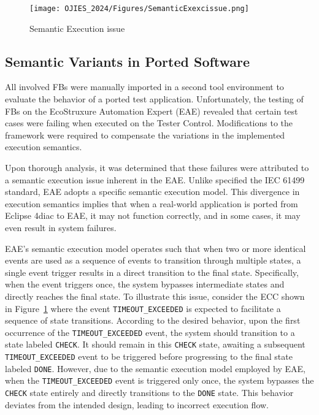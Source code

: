 \begin{figure}[h!]
	\centering
		\texttt{[image: OJIES\_2024/Figures/SemanticExexcissue.png]}
		\caption{Semantic Execution issue}
		\label{fig:SemanticExexcissue}	
 \end{figure}

\subsection{Semantic Variants in Ported Software}
All involved FBs were manually imported in a second tool environment to evaluate the behavior of a ported test application. Unfortunately, the testing of FBs on the EcoStruxure Automation Expert (EAE) revealed that certain test cases were failing when executed on the Tester Control. Modifications to the framework were required to compensate the variations in the implemented execution semantics.

Upon thorough analysis, it was determined that these failures were attributed to a semantic execution issue inherent in the EAE. Unlike specified the IEC 61499 standard, EAE adopts a specific semantic execution model. This divergence in execution semantics implies that when a real-world application is ported from Eclipse 4diac to EAE, it may not function correctly, and in some cases, it may even result in system failures.

EAE's semantic execution model operates such that when two or more identical events are used as a sequence of events to transition through multiple states, a single event trigger results in a direct transition to the final state. Specifically, when the event triggers once, the system bypasses intermediate states and directly reaches the final state. 
To illustrate this issue, consider the ECC shown in Figure~\ref{fig:SemanticExexcissue} where the event \texttt{TIMEOUT\_EXCEEDED} is expected to facilitate a sequence of state transitions. According to the desired behavior, upon the first occurrence of the \texttt{TIMEOUT\_EXCEEDED} event, the system should transition to a state labeled \texttt{CHECK}. It should remain in this \texttt{CHECK} state, awaiting a subsequent \texttt{TIMEOUT\_EXCEEDED} event to be triggered before progressing to the final state labeled \texttt{DONE}. However, due to the semantic execution model employed by EAE, when the \texttt{TIMEOUT\_EXCEEDED} event is triggered only once, the system bypasses the \texttt{CHECK} state entirely and directly transitions to the \texttt{DONE} state. This behavior deviates from the intended design, leading to incorrect execution flow.

